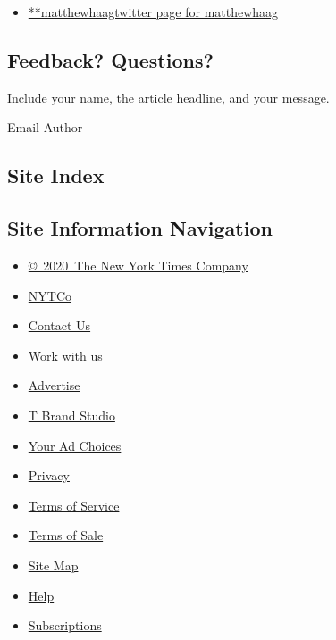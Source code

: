 \begin{itemize}
\tightlist
\item
  \href{https://twitter.com/matthewhaag}{**matthewhaagtwitter page for
  matthewhaag}
\end{itemize}

\hypertarget{feedback-questions}{%
\subsection{Feedback? Questions?}\label{feedback-questions}}

Include your name, the article headline, and your message.

Email Author

\hypertarget{site-index}{%
\subsection{Site Index}\label{site-index}}

\hypertarget{site-information-navigation}{%
\subsection{Site Information
Navigation}\label{site-information-navigation}}

\begin{itemize}
\tightlist
\item
  \href{https://help.nytimes.com/hc/en-us/articles/115014792127-Copyright-notice}{©~2020~The
  New York Times Company}
\end{itemize}

\begin{itemize}
\tightlist
\item
  \href{https://www.nytco.com/}{NYTCo}
\item
  \href{https://help.nytimes.com/hc/en-us/articles/115015385887-Contact-Us}{Contact
  Us}
\item
  \href{https://www.nytco.com/careers/}{Work with us}
\item
  \href{https://nytmediakit.com/}{Advertise}
\item
  \href{http://www.tbrandstudio.com/}{T Brand Studio}
\item
  \href{https://www.nytimes.com/privacy/cookie-policy\#how-do-i-manage-trackers}{Your
  Ad Choices}
\item
  \href{https://www.nytimes.com/privacy}{Privacy}
\item
  \href{https://help.nytimes.com/hc/en-us/articles/115014893428-Terms-of-service}{Terms
  of Service}
\item
  \href{https://help.nytimes.com/hc/en-us/articles/115014893968-Terms-of-sale}{Terms
  of Sale}
\item
  \href{https://spiderbites.nytimes.com}{Site Map}
\item
  \href{https://help.nytimes.com/hc/en-us}{Help}
\item
  \href{https://www.nytimes.com/subscription?campaignId=37WXW}{Subscriptions}
\end{itemize}
